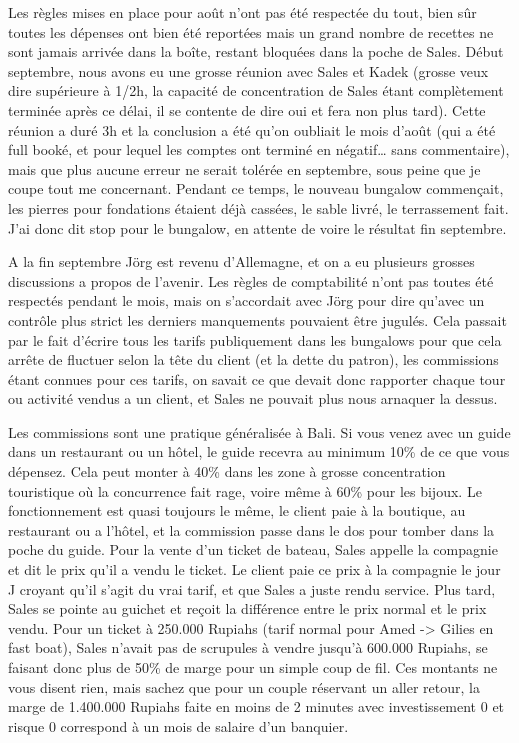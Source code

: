 Les règles mises en place pour août n’ont pas été respectée du tout, bien sûr toutes les dépenses ont bien été reportées mais un grand nombre de recettes ne sont jamais arrivée dans la boîte, restant bloquées dans la poche de Sales. Début septembre, nous avons eu une grosse réunion avec Sales et Kadek (grosse veux dire supérieure à 1/2h, la capacité de concentration de Sales étant complètement terminée après ce délai, il se contente de dire oui et fera non plus tard). Cette réunion a duré 3h et la conclusion a été qu’on oubliait le mois d’août (qui a été full booké, et pour lequel les comptes ont terminé en négatif… sans commentaire), mais que plus aucune erreur ne serait tolérée en septembre, sous peine que je coupe tout me concernant. Pendant ce temps, le nouveau bungalow commençait, les pierres pour fondations étaient déjà cassées, le sable livré, le terrassement fait. J’ai donc dit stop pour le bungalow, en attente de voire le résultat fin septembre.

A la fin septembre Jörg est revenu d’Allemagne, et on a eu plusieurs grosses discussions a propos de l’avenir. Les règles de comptabilité n’ont pas toutes été respectés pendant le mois, mais on s’accordait avec Jörg pour dire qu’avec un contrôle plus strict les derniers manquements pouvaient être jugulés. Cela passait par le fait d’écrire tous les tarifs publiquement dans les bungalows pour que cela arrête de fluctuer selon la tête du client (et la dette du patron), les commissions étant connues pour ces tarifs, on savait ce que devait donc rapporter chaque tour ou activité vendus a un client, et Sales ne pouvait plus nous arnaquer la dessus.

Les commissions sont une pratique généralisée à Bali. Si vous venez avec un guide dans un restaurant ou un hôtel, le guide recevra au minimum 10\% de ce que vous dépensez. Cela peut monter à 40\% dans les zone à grosse concentration touristique où la concurrence fait rage, voire même à 60\% pour les bijoux. Le fonctionnement est quasi toujours le même, le client paie à la boutique, au restaurant ou a l’hôtel, et la commission passe dans le dos pour tomber dans la poche du guide. Pour la vente d’un ticket de bateau, Sales appelle la compagnie et dit le prix qu’il a vendu le ticket. Le client paie ce prix à la compagnie le jour J croyant qu’il s’agit du vrai tarif, et que Sales a juste rendu service. Plus tard, Sales se pointe au guichet et reçoit la différence entre le prix normal et le prix vendu. Pour un ticket à 250.000 Rupiahs (tarif normal pour Amed -> Gilies en fast boat), Sales n’avait pas de scrupules à vendre jusqu’à 600.000 Rupiahs, se faisant donc plus de 50\% de marge pour un simple coup de fil. Ces montants ne vous disent rien, mais sachez que pour un couple réservant un aller retour, la marge de 1.400.000 Rupiahs faite en moins de 2 minutes avec investissement 0 et risque 0 correspond à un mois de salaire d’un banquier.

